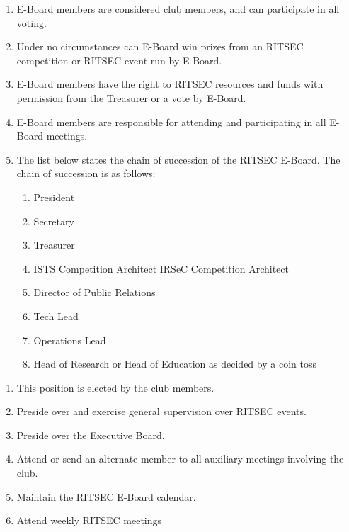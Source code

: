 


\begin{enumerate}
  \item E-Board members are considered club members, and can participate in all
    voting.
  \item Under no circumstances can E-Board win prizes from an RITSEC
    competition or RITSEC event run by E-Board.
  \item E-Board members have the right to RITSEC resources and funds with
    permission from the Treasurer or a vote by E-Board.
  \item E-Board members are responsible for attending and participating in all
    E-Board meetings.
  \item The list below states the chain of succession of the RITSEC E-Board.
    The chain of succession is as follows:
  \begin{enumerate}
    \item President
    \item Secretary
    \item Treasurer
    \item ISTS Competition Architect 
    \itme IRSeC Competition Architect
    \item Director of Public Relations
    \item Tech Lead
    \item Operations Lead
    \item Head of Research or Head of Education as decided by a coin toss
  \end{enumerate}
\end{enumerate}


\begin{enumerate}
  \item This position is elected by the club members.
  \item Preside over and exercise general supervision over RITSEC events. 
  \item Preside over the Executive Board.
  \item Attend or send an alternate member to all auxiliary meetings involving
    the club.
  \item Maintain the RITSEC E-Board calendar.
  \item Attend weekly RITSEC meetings
\end{enumerate}

